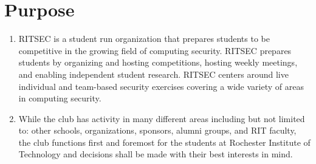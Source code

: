 
\section{Purpose}

\begin{enumerate}
  \item RITSEC is a student run organization that prepares students to be
    competitive in the growing field of computing security. RITSEC prepares
    students by organizing and hosting competitions, hosting weekly meetings,
    and enabling independent student research. RITSEC centers around live
    individual and team-based security exercises covering a wide variety of
    areas in computing security.
  \item While the club has activity in many different areas including but not
    limited to: other schools, organizations, sponsors, alumni groups, and RIT
    faculty, the club functions first and foremost for the students at
    Rochester Institute of Technology and decisions shall be made with their
    best interests in mind.
\end{enumerate}
